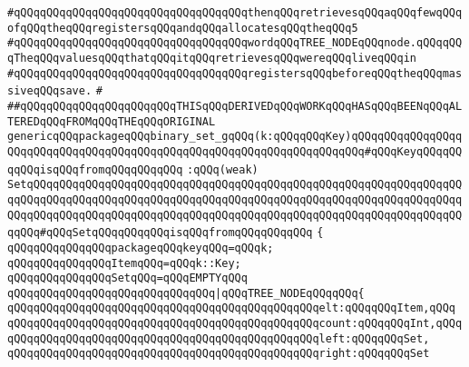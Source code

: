 \verb|#qQQqqQQqqQQqqQQqqQQqqQQqqQQqqQQqqQQqthenqQQqretrievesqQQqaqQQqfewqQQqofqQQqtheqQQqregistersqQQqandqQQqallocatesqQQqtheqQQq5|\newline
\verb|#qQQqqQQqqQQqqQQqqQQqqQQqqQQqqQQqqQQqwordqQQqTREE_NODEqQQqnode.qQQqqQQqTheqQQqvaluesqQQqthatqQQqitqQQqretrievesqQQqwereqQQqliveqQQqin|\newline
\verb|#qQQqqQQqqQQqqQQqqQQqqQQqqQQqqQQqqQQqregistersqQQqbeforeqQQqtheqQQqmassiveqQQqsave.|\newline
\verb|#|\newline
\newline
\newline
\verb|##qQQqqQQqqQQqqQQqqQQqqQQqTHISqQQqDERIVEDqQQqWORKqQQqHASqQQqBEENqQQqALTEREDqQQqFROMqQQqTHEqQQqORIGINAL|\newline
\newline
\newline
\verb|genericqQQqpackageqQQqbinary_set_gqQQq(k:qQQqqQQqKey)qQQqqQQqqQQqqQQqqQQqqQQqqQQqqQQqqQQqqQQqqQQqqQQqqQQqqQQqqQQqqQQqqQQqqQQq#qQQqKeyqQQqqQQqqQQqisqQQqfromqQQqqQQqqQQq|\newline
\verb|:qQQq(weak)|\newline
\verb|SetqQQqqQQqqQQqqQQqqQQqqQQqqQQqqQQqqQQqqQQqqQQqqQQqqQQqqQQqqQQqqQQqqQQqqQQqqQQqqQQqqQQqqQQqqQQqqQQqqQQqqQQqqQQqqQQqqQQqqQQqqQQqqQQqqQQqqQQqqQQqqQQqqQQqqQQqqQQqqQQqqQQqqQQqqQQqqQQqqQQqqQQqqQQqqQQqqQQqqQQqqQQqqQQqqQQq#qQQqSetqQQqqQQqqQQqisqQQqfromqQQqqQQqqQQq|\newline
\verb|{|\newline
\verb|qQQqqQQqqQQqqQQqpackageqQQqkeyqQQq=qQQqk;|\newline
\newline
\verb|qQQqqQQqqQQqqQQqItemqQQq=qQQqk::Key;|\newline
\newline
\verb|qQQqqQQqqQQqqQQqSetqQQq=qQQqEMPTYqQQq|\newline
\verb|qQQqqQQqqQQqqQQqqQQqqQQqqQQqqQQq|\verb#|qQQqTREE_NODEqQQqqQQq{#\newline
\verb|qQQqqQQqqQQqqQQqqQQqqQQqqQQqqQQqqQQqqQQqqQQqqQQqelt:qQQqqQQqItem,qQQq|\newline
\verb|qQQqqQQqqQQqqQQqqQQqqQQqqQQqqQQqqQQqqQQqqQQqqQQqcount:qQQqqQQqInt,qQQq|\newline
\verb|qQQqqQQqqQQqqQQqqQQqqQQqqQQqqQQqqQQqqQQqqQQqqQQqleft:qQQqqQQqSet,|\newline
\verb|qQQqqQQqqQQqqQQqqQQqqQQqqQQqqQQqqQQqqQQqqQQqqQQqright:qQQqqQQqSet|\newline
